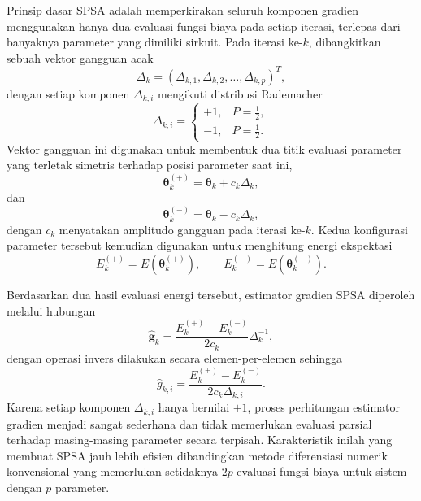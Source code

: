 Prinsip dasar SPSA adalah memperkirakan seluruh komponen gradien menggunakan hanya dua evaluasi fungsi biaya pada setiap iterasi, terlepas dari banyaknya parameter yang dimiliki sirkuit. Pada iterasi ke-$k$, dibangkitkan sebuah vektor gangguan acak
\begin{equation}
    \Delta_k=
    \left(
    \Delta_{k,1},
    \Delta_{k,2},
    \ldots,
    \Delta_{k,p}
    \right)^T ,
\end{equation}
dengan setiap komponen $\Delta_{k,i}$ mengikuti distribusi Rademacher
\begin{equation}
    \Delta_{k,i}
    =
    \begin{cases}
        +1, & P=\frac{1}{2},\\
        -1, & P=\frac{1}{2}.
    \end{cases}
\end{equation}
Vektor gangguan ini digunakan untuk membentuk dua titik evaluasi parameter yang terletak simetris terhadap posisi parameter saat ini,
\begin{equation}
    \boldsymbol{\theta}_{k}^{(+)}
    =
    \boldsymbol{\theta}_{k}
    +
    c_k \Delta_k,
\end{equation}
dan
\begin{equation}
    \boldsymbol{\theta}_{k}^{(-)}
    =
    \boldsymbol{\theta}_{k}
    -
    c_k \Delta_k,
\end{equation}
dengan $c_k$ menyatakan amplitudo gangguan pada iterasi ke-$k$. Kedua konfigurasi parameter tersebut kemudian digunakan untuk menghitung energi ekspektasi
\begin{equation}
    E_k^{(+)}
    =
    E\!\left(
    \boldsymbol{\theta}_{k}^{(+)}
    \right),
    \qquad
    E_k^{(-)}
    =
    E\!\left(
    \boldsymbol{\theta}_{k}^{(-)}
    \right).
\end{equation}

Berdasarkan dua hasil evaluasi energi tersebut, estimator gradien SPSA diperoleh melalui hubungan
\begin{equation}
    \hat{\mathbf{g}}_k
    =
    \frac{
    E_k^{(+)}
    -
    E_k^{(-)}
    }{
    2c_k
    }
    \Delta_k^{-1},
\end{equation}
dengan operasi invers dilakukan secara elemen-per-elemen sehingga
\begin{equation}
    \hat{g}_{k,i}
    =
    \frac{
    E_k^{(+)}
    -
    E_k^{(-)}
    }{
    2c_k \Delta_{k,i}
    }.
\end{equation}
Karena setiap komponen $\Delta_{k,i}$ hanya bernilai $\pm1$, proses perhitungan estimator gradien menjadi sangat sederhana dan tidak memerlukan evaluasi parsial terhadap masing-masing parameter secara terpisah. Karakteristik inilah yang membuat SPSA jauh lebih efisien dibandingkan metode diferensiasi numerik konvensional yang memerlukan setidaknya $2p$ evaluasi fungsi biaya untuk sistem dengan $p$ parameter.

